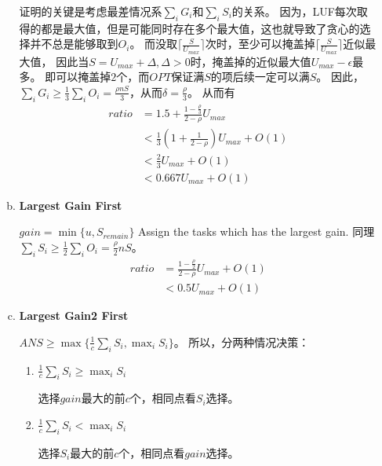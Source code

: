 \documentclass[UTF8]{ctexart}
\newcommand{\Emph}{\textbf}
\begin{document}
\begin{enumerate}[I]
\begin{enumerate}[(a)]
		证明的关键是考虑最差情况系$\sum_{i} G_i$和$\sum_{i} S_i$的关系。
		因为，LUF每次取得的都是最大值，但是可能同时存在多个最大值，这也就导致了贪心的选择并不总是能够取到$O_i$。
		而没取$\lceil \frac{S}{U_{max}} \rceil$次时，至少可以掩盖掉$\lceil \frac{S}{U_{max}} \rceil$近似最大值，
		因此当$S = U_{max} + \Delta, \Delta>0$时，掩盖掉的近似最大值$U_{max} - \epsilon$最多。
		即可以掩盖掉$2$个，而$OPT$保证满$S$的项后续一定可以满$S$。
		因此，$\sum_{i} G_i \ge \frac{1}{3} \sum_{i} O_i = \frac{\rho nS}{3}$，从而$\delta = \frac{\rho}{3}$。
		从而有
		\begin{align*}
			ratio &= 1.5 + \frac{1-\frac{\rho}{3}}{2-\rho} U_{max} \\
				  &< \frac{1}{3}(1 + \frac{1}{2-\rho}) U_{max} + O(1) \\
				  &< \frac{2}{3} U_{max} + O(1) \\
				  &< 0.667 U_{max} + O(1) 
		\end{align*}
		
		\newpage
		\item \Emph{Largest Gain First}
		
		$gain = \min \{ u, S_{remain} \}$
		Assign the tasks which has the largest gain.
		同理$\sum_{i} S_i \ge \frac{1}{2} \sum_{i} O_i = \frac{\rho}{2} nS$。
		\begin{align*}
			ratio &= \frac{1-\frac{\rho}{2}}{2-\rho} U_{max} + O(1) \\
				  &< 0.5 U_{max} + O(1)
 		\end{align*}
		
		\item \Emph{Largest Gain2 First}
		
		$ANS \ge \max \{ \frac{1}{c} \sum_{i}{S_i}, \max_{i} S_i \}$。
		所以，分两种情况决策：
		\begin{enumerate}[(1)]
			\item $\frac{1}{c} \sum_{i}{S_i} \ge \max_{i} S_i$ 
			
			选择$gain$最大的前$c$个，相同点看$S_i$选择。
			
			\item $\frac{1}{c} \sum_{i}{S_i} < \max_{i} S_i$
			
			选择$S_i$最大的前$c$个，相同点看$gain$选择。
			
		\end{enumerate}
		
		
	\end{enumerate}
	
\end{enumerate}
\end{document}
